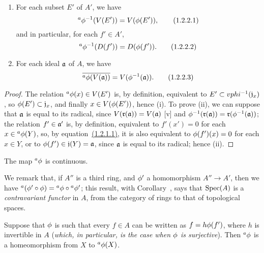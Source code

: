 \begin{prop}[1.2.2]
\label{1.1.2.2}
\medskip\noindent
\begin{enumerate}[label=\emph{(\roman*)}]
  \item For each subset $E'$ of $A'$, we have
    \[
      {}^a\phi^{-1}(V(E'))=V(\phi(E')),
      \tag{1.2.2.1}
    \]
    and in particular, for each $f'\in A'$,
    \[
      {}^a\phi^{-1}(D(f'))=D(\phi(f')).
      \tag{1.2.2.2}
    \]
  \item For each ideal $\mathfrak{a}$ of $A$, we have
    \[
      \overline{{}^a\phi(V(\mathfrak{a}))}=V(\phi^{-1}(\mathfrak{a})).
      \tag{1.2.2.3}
    \]
\end{enumerate}
\end{prop}

\begin{proof}
\label{proof-1.1.2.2}
The relation ${}^a\phi(x)\in V(E')$ is, by definition, equivalent to $E'\subset vphi^{-1}(\mathfrak{j}_x)$, so $\phi(E')\subset\mathfrak{j}_x$, and finally $x\in V(\phi(E'))$, hence (i).
To prove (ii), we can suppose that $\mathfrak{a}$ is equal to its radical, since $V(\mathfrak{r}(\mathfrak{a}))=V(\mathfrak{a})$ [v] and $\phi^{-1}(\mathfrak{r}(\mathfrak{a}))=\mathfrak{r}(\phi^{-1}(\mathfrak{a}))$;
the relation $f'\in\mathfrak{a}'$ is, by definition, equivalent to $f'(x')=0$ for each $x\in{{}^a\phi(Y)}$, so, by equation~\hyperref[1.1.2.1]{(1.2.1.1)}, it is also equivalent to $\phi(f')(x)=0$ for each $x\in Y$, or to $\phi(f')\in\mathfrak{j}(Y)=\mathfrak{a}$, since $\mathfrak{a}$ is equal to its radical;
hence (ii).
\end{proof}

\begin{cor}[1.2.3]
\label{1.1.2.3}
The map ${}^a\phi$ is continuous.
\end{cor}

We remark that, if $A''$ is a third ring, and $\phi'$ a homomorphism $A''\to A'$, then we have ${}^a(\phi'\circ\phi)={}^a\phi\circ{}^a\phi'$;
this result, with Corollary~, says that ${\mathop{\mathrm{Spec}}\nolimits}(A)$ is a \emph{contravariant functor} in $A$, from the category of rings to that of topological spaces.

\begin{cor}[1.2.4]
\label{1.1.2.4}
Suppose that $\phi$ is such that every $f\in A$ can be written as $f=h\phi(f')$, where $h$ is invertible in $A$ (\emph{which, in particular, is the case when $\phi$ is \emph{surjective}}).
Then ${}^a\phi$ is a homeomorphism from $X$ to ${}^a\phi(X)$.
\end{cor}


